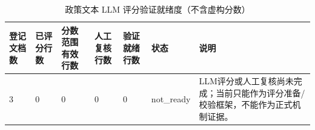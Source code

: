 \begin{table}
\caption{政策文本 LLM 评分验证就绪度（不含虚构分数）}
\label{tab:policy_llm_validation_readiness}
\begin{tabular}{lllllll}
\toprule
登记文档数 & 已评分行数 & 分数范围有效行数 & 人工复核行数 & 验证就绪行数 & 状态 & 说明 \\
\midrule
3 & 0 & 0 & 0 & 0 & not_ready & LLM评分或人工复核尚未完成；当前只能作为评分准备/校验框架，不能作为正式机制证据。 \\
\bottomrule
\end{tabular}
\end{table}

